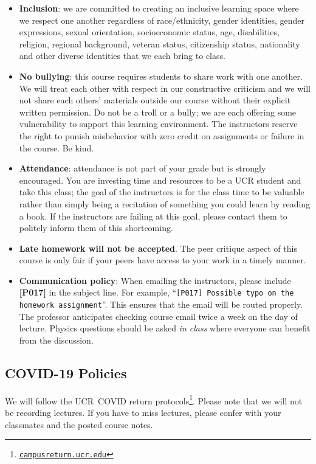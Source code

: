 \documentclass[12pt]{article}
\newcommand{\footlink}[1]{\footnote{\href{https://#1}{\texttt{#1}}}}
\newcommand{\UCR}{\acro{UCR}\xspace}
\newcommand\acro[1]{{\small {#1}}}
\numberwithin{equation}{section}    %
\begin{document}
\begin{itemize}
	\item \textbf{Inclusion}: we are committed to creating an inclusive learning space where we respect one another regardless of race/ethnicity, gender identities, gender expressions, sexual orientation, socioeconomic status, age, disabilities, religion, regional background, veteran status, citizenship status, nationality and other diverse identities that we each bring to class.
	\item \textbf{No bullying}: this course requires students to share work with one another. We will treat each other with respect in our constructive criticism and we will not share each others' materials outside our course without their explicit written permission. Do not be a troll or a bully; we are each offering some vulnerability to support this learning environment. The instructors reserve the right to punish misbehavior with zero credit on assignments or failure in the course. Be kind.
	\item \textbf{Attendance}: attendance is not part of your grade but is strongly encouraged. You are investing time and resources to be a \UCR student and take this class; the goal of the instructors is for the class time to be valuable rather than simply being a recitation of something you could learn by reading a book. If the instructors are failing at this goal, please contact them to politely inform them of this shortcoming. 
	\item \textbf{Late homework will not be accepted}. The peer critique aspect of this course is only fair if your peers have access to your work in a timely manner.  
	\item \textbf{Communication policy}: When emailing the instructors, please include \textbf{[P017]} in the subject line. For example, ``\texttt{[P017] Possible typo on the homework assignment}''. This ensures that the email will be routed properly. The professor anticipates checking course email twice a week on the day of lecture. Physics questions should be asked \emph{in class} where everyone can benefit from the discussion.
\end{itemize}

\subsection{COVID-19 Policies}

We will follow the \UCR~\acro{COVID} return protocols\footlink{campusreturn.ucr.edu}. Please note that we will not be recording lectures. If you have to miss lectures, please confer with your classmates and the posted course notes. 
\end{document}
